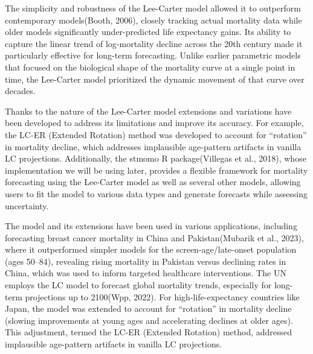 \documentclass[
  12pt,
]{report}
\begin{document}
The simplicity and robustness of the Lee-Carter model allowed it to
outperform contemporary models(Booth, 2006), closely tracking actual
mortality data while older models significantly under-predicted life
expectancy gains. Its ability to capture the linear trend of
log-mortality decline across the 20th century made it particularly
effective for long-term forecasting. Unlike earlier parametric models
that focused on the biological shape of the mortality curve at a single
point in time, the Lee-Carter model prioritized the dynamic movement of
that curve over decades.

Thanks to the nature of the Lee-Carter model extensions and variations
have been developed to address its limitations and improve its accuracy.
For example, the LC-ER (Extended Rotation) method was developed to
account for ``rotation'' in mortality decline, which addresses
implausible age-pattern artifacts in vanilla LC projections.
Additionally, the stmomo R package(Villegas et al., 2018), whose
implementation we will be using later, provides a flexible framework for
mortality forecasting using the Lee-Carter model as well as several
other models, allowing users to fit the model to various data types and
generate forecasts while assessing uncertainty.

The model and its extensions have been used in various applications,
including forecasting breast cancer mortality in China and
Pakistan(Mubarik et al., 2023), where it outperformed simpler models for
the screen-age/late-onset population (ages 50--84), revealing rising
mortality in Pakistan versus declining rates in China, which was used to
inform targeted healthcare interventions. The UN employs the LC model to
forecast global mortality trends, especially for long-term projections
up to 2100(Wpp, 2022). For high-life-expectancy countries like Japan,
the model was extended to account for ``rotation'' in mortality decline
(slowing improvements at young ages and accelerating declines at older
ages). This adjustment, termed the LC-ER (Extended Rotation) method,
addressed implausible age-pattern artifacts in vanilla LC projections.
\end{document}
